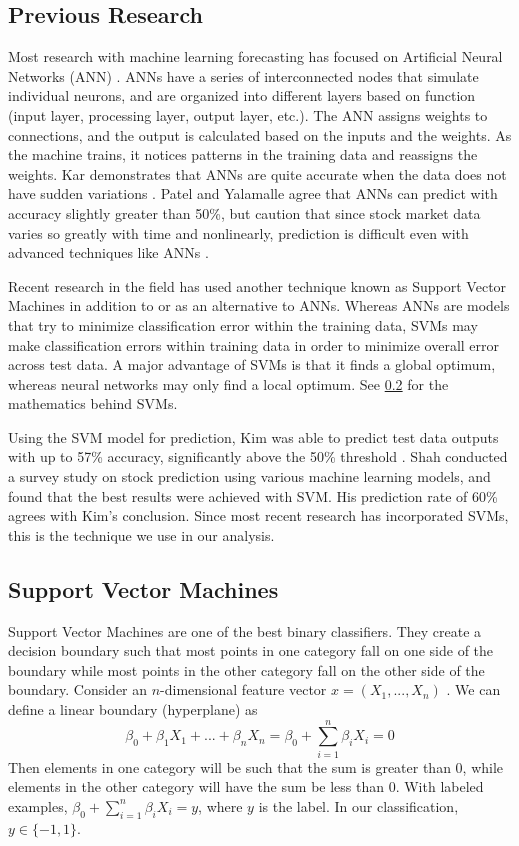 \documentclass[pageno]{jpaper}
\begin{document}
\subsection{Previous Research}
\label{subsec: previous}

Most research with machine learning forecasting has focused on Artificial Neural Networks (ANN) \cite{krollner}. ANNs have a series of interconnected nodes that simulate individual neurons, and are organized into different layers based on function (input layer, processing layer, output layer, etc.). The ANN assigns weights to connections, and the output is calculated based on the inputs and the weights. As the machine trains, it notices patterns in the training data and reassigns the weights. Kar demonstrates that ANNs are quite accurate when the data does not have sudden variations \cite{kar}. Patel and Yalamalle agree that ANNs can predict with accuracy slightly greater than 50\%, but caution that since stock market data varies so greatly with time and nonlinearly, prediction is difficult even with advanced techniques like ANNs \cite{patel}.

Recent research in the field has used another technique known as Support Vector Machines in addition to or as an alternative to ANNs. Whereas ANNs are models that try to minimize classification error within the training data, SVMs may make classification errors within training data in order to minimize overall error across test data. A major advantage of SVMs is that it finds a global optimum, whereas neural networks may only find a local optimum. See \ref{subsec: svm} for the mathematics behind SVMs.

Using the SVM model for prediction, Kim was able to predict test data outputs with up to 57\% accuracy, significantly above the 50\% threshold \cite{kim}. Shah conducted a survey study on stock prediction using various machine learning models, and found that the best results were achieved with SVM\cite{shah}. His prediction rate of 60\% agrees with Kim's conclusion. Since most recent research has incorporated SVMs, this is the technique we use in our analysis.

\subsection{Support Vector Machines}
\label{subsec: svm}

Support Vector Machines are one of the best binary classifiers. They create a decision boundary such that most points in one category fall on one side of the boundary while most points in the other category fall on the other side of the boundary. Consider an $n$-dimensional feature vector $x = (X_1, ..., X_n)$ \cite{halls-moore}. We can define a linear boundary (hyperplane) as 
$$\beta_0+\beta_1X_1+...+\beta_nX_n=\beta_0+\sum_{i=1}^n\beta_iX_i = 0$$
Then elements in one category will be such that the sum is greater than 0, while elements in the other category will have the sum be less than 0. With labeled examples, $\beta_0+\sum_{i=1}^n\beta_iX_i = y$, where $y$ is the label. In our classification, $y \in \{-1, 1\}$.
\end{document}
